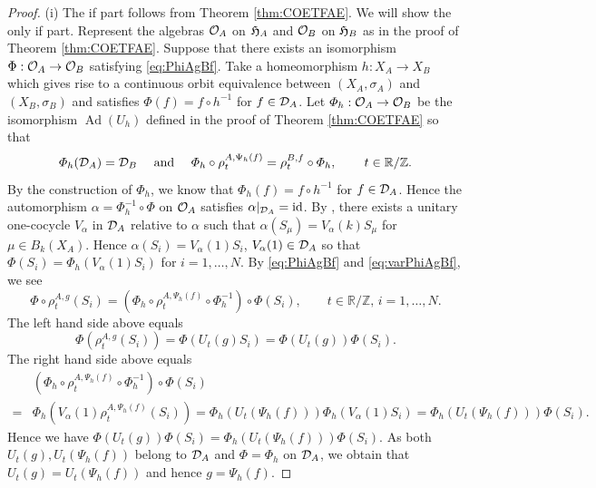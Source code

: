 \documentclass[11pt]{article}
\theoremstyle{plain}
\theoremstyle{definition}
\numberwithin{equation}{section}
\newcommand{\id}{\operatorname{id}}
\newcommand{\Ad}{\operatorname{Ad}}
\newcommand{\RZ}{\mathbb{R}/{\mathbb{Z}}}
\begin{document}
\begin{proof}
(i) 
The if part follows from Theorem \ref{thm:COETFAE}.
We will show the only if part.
Represent the algebras 
${{\mathcal{O}}_A}$ on ${{\frak H}_A}$ and ${{\mathcal{O}}_B}$ on ${{\frak H}_B}$
as in the proof of Theorem \ref{thm:COETFAE}.
Suppose that there exists an isomorphism
$\Phi:{{\mathcal{O}}_A}\rightarrow {{\mathcal{O}}_B}$ satisfying
\eqref{eq:PhiAgBf}.
Take a homeomorphism
$h:X_A\rightarrow X_B$ which gives rise to a continuous orbit equivalence
between $(X_A,\sigma_A)$ 
and 
$(X_B,\sigma_B)$
and satisfies
$\Phi(f) = f \circ h^{-1}$
for $f \in {{\mathcal{D}}_A}$.
Let $\varPhi_h: {{\mathcal{O}}_A} \rightarrow {{\mathcal{O}}_B}$
be the isomorphism $\Ad(U_h)$
defined in the proof of Theorem \ref{thm:COETFAE}
so that
\begin{equation}
\varPhi_h(\DA)=\DB
\quad
\text{ and }
\quad
\varPhi_h\circ \rho_t^{A,\Psi_h(f)} = 
\rho^{B,f}_t\circ \varPhi_h, \, \qquad t \in \RZ \label{eq:varPhiAgBf}.
\end{equation}
By the construction of $\varPhi_h$, we know that
$\varPhi_h(f) = f \circ h^{-1}$
for $f \in {{\mathcal{D}}_A}$.
Hence the automorphism
$\alpha = \varPhi_h^{-1}\circ \Phi $ on ${{\mathcal{O}}_A}$
satisfies $\alpha|_{\DA} = \id$.
By
\cite[Theorem 6.5 (1)]{MaPacific},
there exists a unitary one-cocycle
$V_\alpha$ in ${{\mathcal{D}}_A}$ relative to $\alpha$ such that
$\alpha(S_\mu) = V_\alpha(k) S_\mu$ for $\mu \in B_k(X_A)$.
Hence
$\alpha(S_i) = V_\alpha(1)S_i$,
$V_\alpha(1) \in {{\mathcal{D}}_A}$ 
so that
$\Phi(S_i) = \varPhi_h(V_\alpha(1)S_i)$ 
for $i=1,\dots,N$.
By \eqref{eq:PhiAgBf} and \eqref{eq:varPhiAgBf}, we see
\begin{equation*}
\Phi\circ \rho^{A,g}_t(S_i) 
= 
(\varPhi_h\circ \rho_t^{A,\Psi_h(f)}\circ
\varPhi_h^{-1}) \circ \Phi(S_i), \qquad t \in \RZ,
\, i=1,\dots, N. \label{eq:PhivarPhiAgBf}
\end{equation*}
The left hand side above equals
\begin{equation*}
\Phi(\rho^{A,g}_t(S_i)) 
= 
\Phi(U_t(g)S_i)
= 
\Phi(U_t(g)) \Phi(S_i).
\end{equation*}
The right hand side above equals
\begin{align*}
& (\varPhi_h\circ \rho_t^{A,\Psi_h(f)}\circ
\varPhi_h^{-1}) \circ \Phi(S_i) \\
= & \varPhi_h(V_\alpha(1) \rho_t^{A,\Psi_h(f)}(S_i)) 
=  \varPhi_h(U_t(\Psi_h(f)) ) \varPhi_h(V_\alpha(1) S_i)
=  \varPhi_h(U_t(\Psi_h(f)) ) \Phi(S_i). 
\end{align*}
Hence we have
$
\Phi(U_t(g)) \Phi(S_i)
= 
\varPhi_h(U_t(\Psi_h(f)) ) \Phi(S_i).
$
As both $U_t(g), U_t(\Psi_h(f))$
belong to ${{\mathcal{D}}_A}$ and
$\Phi = \varPhi_h $ on ${{\mathcal{D}}_A}$,
we obtain that 
$U_t(g) = U_t(\Psi_h(f))$
 and
hence $g =  \Psi_h(f)$.


\end{proof}
\end{document}
